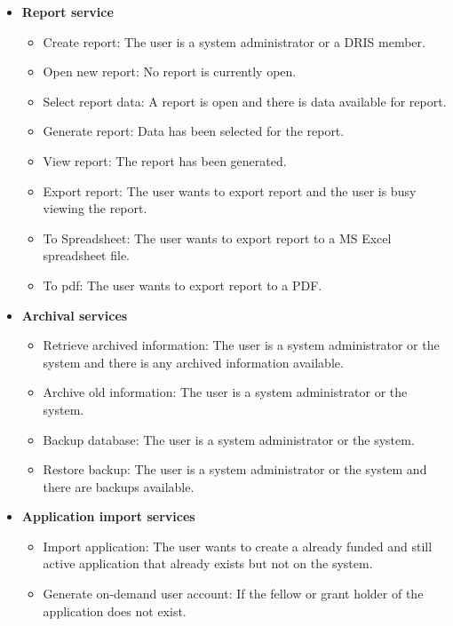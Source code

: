 \documentclass[12pt]{article}
\begin{document}
\begin{itemize}
	\item \textbf{Report service}
		\begin{itemize}
			\item Create report: The user is a system administrator or a DRIS member.
			\item Open new report: No report is currently open.
			\item Select report data: A report is open and there is data available for report.
			\item Generate report: Data has been selected for the report.
			\item View report: The report has been generated.
			\item Export report: The user wants to export report and the user is busy viewing the report.
			\item To Spreadsheet: The user wants to export report to a MS Excel spreadsheet file.
			\item To pdf: The user wants to export report to a PDF.	
		\end{itemize}
	
	
	\item \textbf{Archival services}
		\begin{itemize}
			\item Retrieve archived information: The user is a system administrator or the system and there is any archived information available.
			\item Archive old information: The user is a system administrator or the system.	
			\item Backup database: The user is a system administrator or the system.	
			\item Restore backup: The user is a system administrator or the system and there are backups available.			
		\end{itemize}
		
	\item \textbf{Application import services}
		\begin{itemize}
			\item Import application: The user wants to create a already funded and still active application that already exists but not on the system.
			\item Generate on-demand user account: If the fellow or grant holder of the application does not exist. 					
		\end{itemize}
		

\end{itemize}
\end{document}

